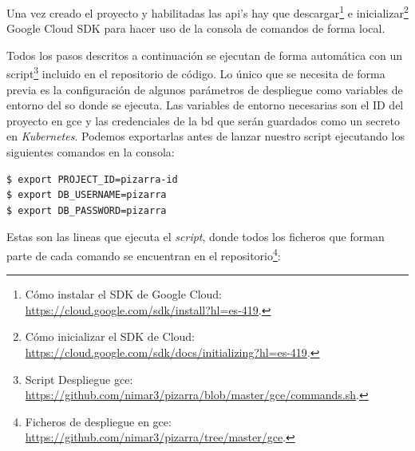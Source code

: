 \documentclass[11pt,spanish,listoffigures,listoftables]{tfgetsinf}
\begin{document}
Una vez creado el proyecto y habilitadas las \acrshort{api}'s hay que descargar\footnote{Cómo instalar el SDK de Google Cloud: \url{https://cloud.google.com/sdk/install?hl=es-419}.} e inicializar\footnote{Cómo inicializar el SDK de Cloud:  \url{https://cloud.google.com/sdk/docs/initializing?hl=es-419}.} Google Cloud SDK para hacer uso de la consola de comandos de forma local. 

Todos los pasos descritos a continuación se ejecutan de forma automática con un script\footnote{Script Despliegue \acrshort{gce}: \url{https://github.com/nimar3/pizarra/blob/master/gce/commands.sh}.} incluido en el repositorio de código. Lo único que se necesita de forma previa es la configuración de algunos parámetros de despliegue como variables de entorno del \acrshort{so} donde se ejecuta.
Las variables de entorno necesarias son el ID del proyecto en \acrshort{gce} y las credenciales de la \acrshort{bd} que serán guardados como un secreto en \textit{Kubernetes}. Podemos exportarlas antes de lanzar nuestro script ejecutando los siguientes comandos en la consola:
\begin{lstlisting}[style=ascii-tree]
$ export PROJECT_ID=pizarra-id
$ export DB_USERNAME=pizarra
$ export DB_PASSWORD=pizarra
\end{lstlisting}

Estas son las lineas que ejecuta el \textit{script}, donde todos los ficheros que forman parte de cada comando se encuentran en el repositorio\footnote{Ficheros de despliegue en \acrshort{gce}: \url{https://github.com/nimar3/pizarra/tree/master/gce}.}: 
\end{document}
